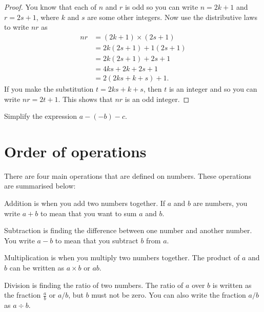\documentclass[a4paper,oneside,12pt]{article}
\begin{document}
\begin{proof}
You know that each of $n$ and $r$ is odd so you can write
$n = 2k + 1$ and $r = 2s + 1$, where $k$ and $s$ are some other
integers.  Now use the distributive laws to write $nr$ as
\begin{align*}
nr
&=
(2k + 1) \times (2s + 1) \\[4pt]
&=
2k(2s + 1) + 1(2s + 1) \\[4pt]
&=
2k(2s + 1) + 2s + 1 \\[4pt]
&=
4ks + 2k + 2s + 1 \\[4pt]
&=
2(2ks + k + s) + 1.
\end{align*}
If you make the substitution $t = 2ks + k + s$, then $t$ is an integer
and so you can write $nr = 2t + 1$.  This shows that $nr$ is an odd
integer.
\end{proof}

\begin{exercise}
Simplify the expression $a - (-b) - c$.
\end{exercise}




\section{Order of operations}

There are four main operations that are defined on numbers.  These
operations are summarised below:
\begin{packedenumeral}
\item Addition is when you add two numbers together.  If $a$ and $b$
  are numbers, you write $a + b$ to mean that you want to sum $a$ and
  $b$.

\item Subtraction is finding the difference between one number and
  another number.  You write $a - b$ to mean that you subtract $b$
  from $a$.

\item Multiplication is when you multiply two numbers together.  The
  product of $a$ and $b$ can be written as $a \times b$ or $ab$.

\item Division is finding the ratio of two numbers.  The ratio of $a$
  over $b$ is written as the fraction $\frac{a}{b}$ or $a/b$, but $b$
  must not be zero.  You can also write the fraction $a/b$ as
  $a \div b$.
\end{packedenumeral}
\end{document}
